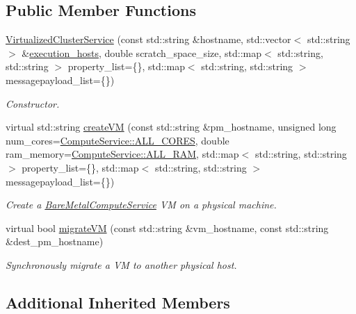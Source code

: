 \subsection*{Public Member Functions}
\begin{DoxyCompactItemize}
\item 
\hyperlink{classwrench_1_1_virtualized_cluster_service_a7be5224d65410f4570ce9f9e9c835bd5}{Virtualized\+Cluster\+Service} (const std\+::string \&hostname, std\+::vector$<$ std\+::string $>$ \&\hyperlink{classwrench_1_1_cloud_service_a8225cae457e491f3f3aad32653910ea0}{execution\+\_\+hosts}, double scratch\+\_\+space\+\_\+size, std\+::map$<$ std\+::string, std\+::string $>$ property\+\_\+list=\{\}, std\+::map$<$ std\+::string, std\+::string $>$ messagepayload\+\_\+list=\{\})
\begin{DoxyCompactList}\small\item\em Constructor. \end{DoxyCompactList}\item 
virtual std\+::string \hyperlink{classwrench_1_1_virtualized_cluster_service_afb90d549ca85f41946b155cff49e37ce}{create\+VM} (const std\+::string \&pm\+\_\+hostname, unsigned long num\+\_\+cores=\hyperlink{classwrench_1_1_compute_service_a1160f521623440ad4e0e0823e08a7d22}{Compute\+Service\+::\+A\+L\+L\+\_\+\+C\+O\+R\+ES}, double ram\+\_\+memory=\hyperlink{classwrench_1_1_compute_service_abc4fe0bad59f544b4b34d0e7d4012d44}{Compute\+Service\+::\+A\+L\+L\+\_\+\+R\+AM}, std\+::map$<$ std\+::string, std\+::string $>$ property\+\_\+list=\{\}, std\+::map$<$ std\+::string, std\+::string $>$ messagepayload\+\_\+list=\{\})
\begin{DoxyCompactList}\small\item\em Create a \hyperlink{classwrench_1_1_bare_metal_compute_service}{Bare\+Metal\+Compute\+Service} VM on a physical machine. \end{DoxyCompactList}\item 
virtual bool \hyperlink{classwrench_1_1_virtualized_cluster_service_a0a81357e7af9b42bbb7b376c56a90611}{migrate\+VM} (const std\+::string \&vm\+\_\+hostname, const std\+::string \&dest\+\_\+pm\+\_\+hostname)
\begin{DoxyCompactList}\small\item\em Synchronously migrate a VM to another physical host. \end{DoxyCompactList}\end{DoxyCompactItemize}
\subsection*{Additional Inherited Members}


